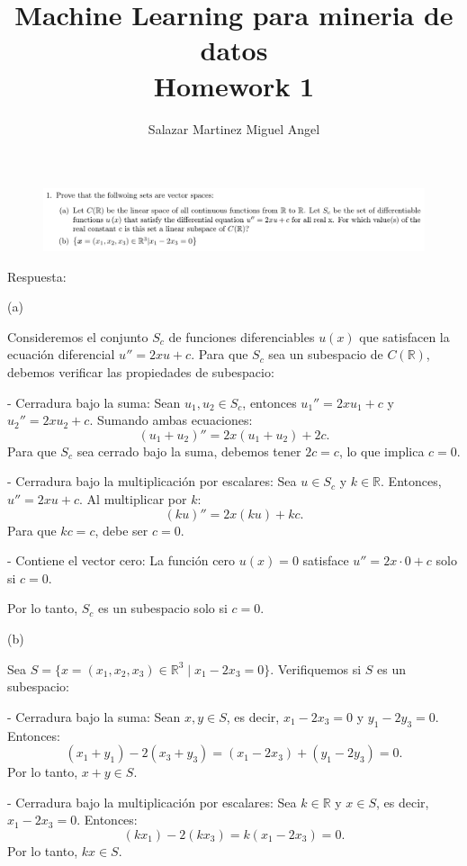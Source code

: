 \documentclass[12pt]{report}
\title{Machine Learning para mineria de datos\\
	Homework 1}
\author{Salazar Martinez Miguel Angel}
\begin{document}
	\renewcommand{\arraystretch}{1.3}
	
	\maketitle
	
\begin{figure}[H]
	\centering
	\includegraphics[width=1\textwidth]{inciso1}
\end{figure}
Respuesta:


(a) 

Consideremos el conjunto \( S_c \) de funciones diferenciables \(u(x) \) que satisfacen la ecuación diferencial \( u'' = 2xu + c\). Para que \( S_c \) sea un subespacio de \( C(\mathbb{R}) \), debemos verificar las propiedades de subespacio:

- Cerradura bajo la suma: Sean \( u_1, u_2 \in S_c \), entonces \( u_1'' = 2xu_1 + c \) y \( u_2'' = 2xu_2 + c \). Sumando ambas ecuaciones:
\[
(u_1 + u_2)'' = 2x(u_1 + u_2) + 2c.
\]
Para que \( S_c \) sea cerrado bajo la suma, debemos tener \( 2c = c \), lo que implica \( c = 0 \).

- Cerradura bajo la multiplicación por escalares: Sea \( u \in S_c \) y \( k \in \mathbb{R} \). Entonces, \( u'' = 2xu + c \). Al multiplicar por \( k \):
\[
(ku)'' = 2x(ku) + kc.
\]
Para que \( kc = c \), debe ser \( c = 0 \).

- Contiene el vector cero: La función cero \( u(x) = 0 \) satisface \( u'' = 2x \cdot 0 + c \) solo si \( c = 0 \).

Por lo tanto, \( S_c \) es un subespacio solo si \( c = 0 \).

(b) 

Sea \( S = \{ x = (x_1, x_2, x_3) \in \mathbb{R}^3 \mid x_1 - 2x_3 = 0 \} \). Verifiquemos si \( S \) es un subespacio:

- Cerradura bajo la suma: Sean \( x, y \in S \), es decir, \( x_1 - 2x_3 = 0 \) y \( y_1 - 2y_3 = 0 \). Entonces:
\[
(x_1 + y_1) - 2(x_3 + y_3) = (x_1 - 2x_3) + (y_1 - 2y_3) = 0.
\]
Por lo tanto, \( x + y \in S \).

- Cerradura bajo la multiplicación por escalares: Sea \( k \in \mathbb{R} \) y \( x \in S \), es decir, \( x_1 - 2x_3 = 0 \). Entonces:
\[
(kx_1) - 2(kx_3) = k(x_1 - 2x_3) = 0.
\]
Por lo tanto, \( kx \in S \).
\end{document}

